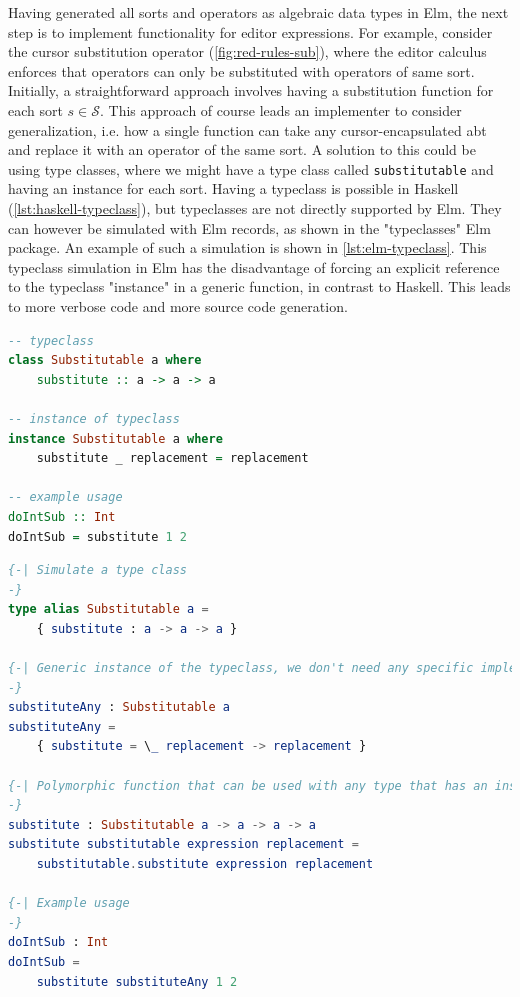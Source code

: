 Having generated all sorts and operators as algebraic data types in Elm,
the next step is to implement functionality for editor expressions.
For example, consider the cursor substitution operator (\cref{fig:red-rules-sub}),
where the editor calculus enforces that operators can only be substituted
with operators of same sort. Initially, a straightforward approach involves
having a substitution function for each sort $s \in \mathcal{S}$.
This approach of course leads an implementer to consider generalization,
i.e. how a single function can take any cursor-encapsulated abt and replace it
with an operator of the same sort. A solution to this could be
using type classes, where we might have a type class called \texttt{substitutable}
and having an instance for each sort.
Having a typeclass is possible in Haskell (\cref{lst:haskell-typeclass}),
but typeclasses are not directly supported by Elm.
They can however be simulated with Elm records, as shown in the "typeclasses"
Elm package\cite{elm-typeclass-package}.
An example of such a simulation is shown in \cref{lst:elm-typeclass}.
This typeclass simulation in Elm has the disadvantage of forcing an explicit
reference to the typeclass "instance" in a generic function, in contrast to Haskell.
This leads to more verbose code and more source code generation.

\begin{lstlisting}[language=Haskell,style=inline,caption={Haskell typeclass example},label={lst:haskell-typeclass}]
-- typeclass
class Substitutable a where 
    substitute :: a -> a -> a
    
-- instance of typeclass
instance Substitutable a where
    substitute _ replacement = replacement

-- example usage
doIntSub :: Int
doIntSub = substitute 1 2 
\end{lstlisting}


\begin{lstlisting}[language=elm,style=inline,caption={Elm typeclass simulation example},label={lst:elm-typeclass}]
{-| Simulate a type class
-}
type alias Substitutable a =
    { substitute : a -> a -> a }

{-| Generic instance of the typeclass, we don't need any specific implementation for each type/sort, we just want to assure that the expression and replacement are of the same type. This is constrained by the `substitute` function signature in the (simulated) typeclass.
-}
substituteAny : Substitutable a
substituteAny =
    { substitute = \_ replacement -> replacement }

{-| Polymorphic function that can be used with any type that has an instance of the `Substitutable` typeclass.
-}
substitute : Substitutable a -> a -> a -> a
substitute substitutable expression replacement =
    substitutable.substitute expression replacement

{-| Example usage
-}
doIntSub : Int
doIntSub =
    substitute substituteAny 1 2
\end{lstlisting}

